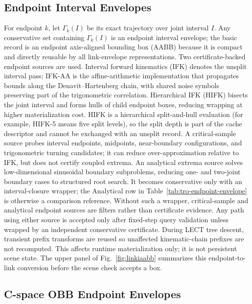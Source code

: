 \documentclass[journal]{IEEEtran}
\begin{document}
\subsection{Endpoint Interval Envelopes}\label{sec:rewrite_endpoint_env}

For endpoint $k$, let $\Gamma_k(I)$ be its exact trajectory over joint interval
$I$.
Any conservative set containing $\Gamma_k(I)$ is an endpoint interval envelope;
the basic record is an endpoint axis-aligned bounding box (AABB) because it is
compact and directly reusable by all link-envelope representations. Two
certificate-backed endpoint sources are used. Interval forward kinematics (IFK)
denotes the unsplit interval pass; \mbox{IFK-AA} is the affine-arithmetic
implementation that propagates bounds along the Denavit--Hartenberg chain, with
shared noise symbols preserving part of the trigonometric correlation.
Hierarchical IFK (HIFK) bisects the joint interval and forms hulls of child
endpoint boxes, reducing wrapping at higher materialization cost. HIFK is a
hierarchical split-and-hull evaluation
(for example, \mbox{HIFK-5} means five split levels), so the split depth is part
of the cache descriptor and cannot be exchanged with an unsplit record. A
critical-sample source probes interval endpoints,
midpoints, near-boundary configurations, and trigonometric turning candidates;
it can reduce over-approximation relative to IFK, but does not certify coupled
extrema.
An analytical extrema source solves low-dimensional sinusoidal boundary
subproblems, reducing one- and two-joint boundary cases to structured root
search. It becomes conservative only with an interval-closure wrapper; the
Analytical row in Table~\ref{tab:tro-endpoint-envelope} is otherwise a
comparison reference.
Without such a wrapper, critical-sample and analytical endpoint sources are
filters rather than certificate evidence. Any path using either source is
accepted only after fixed-step query validation unless wrapped by an independent
conservative certificate. During LECT tree descent, transient prefix transforms are reused so
unaffected kinematic-chain prefixes are not recomputed. This affects runtime
materialization only; it is not persistent scene state.
The upper panel of Fig.~\ref{fig:linkiaabb} summarizes this endpoint-to-link
conversion before the scene check accepts a box.

\subsection{C-space OBB Endpoint Envelopes}\label{sec:obb_endpoint_env}
\end{document}
